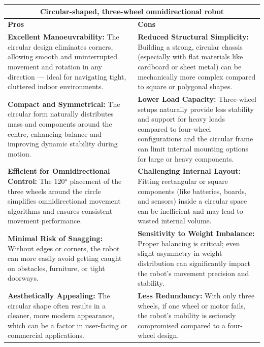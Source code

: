 \begin{table}[H]
\centering
\begin{tabular}{|p{}|p{}|}
\hline
\multicolumn{2}{|c|}{\textbf{Circular-shaped, three-wheel omnidirectional robot}} \\
\hline
\textbf{Pros} & \textbf{Cons} \\
\hline
\textbf{Excellent Manoeuvrability:} The circular design eliminates corners, allowing smooth and uninterrupted movement and rotation in any direction — ideal for navigating tight, cluttered indoor environments. & \textbf{Reduced Structural Simplicity:} Building a strong, circular chassis (especially with flat materials like cardboard or sheet metal) can be mechanically more complex compared to square or polygonal shapes. \\
\hline
\textbf{Compact and Symmetrical:} The circular form naturally distributes mass and components around the centre, enhancing balance and improving dynamic stability during motion. & \textbf{Lower Load Capacity:} Three-wheel setups naturally provide less stability and support for heavy loads compared to four-wheel configurations and the circular frame can limit internal mounting options for large or heavy components. \\
\hline
\textbf{Efficient for Omnidirectional Control:} The 120° placement of the three wheels around the circle simplifies omnidirectional movement algorithms and ensures consistent movement performance. & \textbf{Challenging Internal Layout:} Fitting rectangular or square components (like batteries, boards, and sensors) inside a circular space can be inefficient and may lead to wasted internal volume. \\
\hline
\textbf{Minimal Risk of Snagging:} Without edges or corners, the robot can more easily avoid getting caught on obstacles, furniture, or tight doorways. & \textbf{Sensitivity to Weight Imbalance:} Proper balancing is critical; even slight asymmetry in weight distribution can significantly impact the robot's movement precision and stability. \\
\hline
\textbf{Aesthetically Appealing:} The circular shape often results in a cleaner, more modern appearance, which can be a factor in user-facing or commercial applications. & \textbf{Less Redundancy:} With only three wheels, if one wheel or motor fails, the robot's mobility is seriously compromised compared to a four-wheel design. \\
\hline
\end{tabular}
\end{table}

